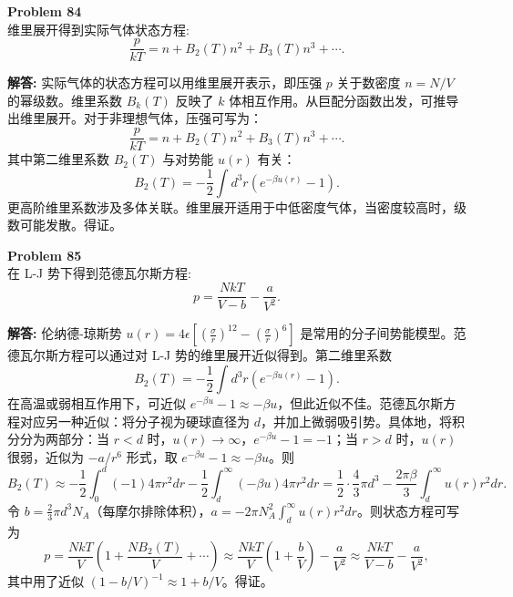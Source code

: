\documentclass[12pt, a4paper, oneside]{ctexart}
\newenvironment{solution}{\par\noindent\textbf{解答:}\quad}{\par}
\begin{document}
\begin{mdframed}[backgroundcolor=gray!10, linewidth=0pt]
    \textbf{Problem 84} \\
    维里展开得到实际气体状态方程:
    \[
    \frac{p}{kT} = n + B_2(T) n^2 + B_3(T) n^3 + \cdots.
    \]
\end{mdframed}
\begin{solution}
    实际气体的状态方程可以用维里展开表示，即压强 $p$ 关于数密度 $n = N/V$ 的幂级数。维里系数 $B_k(T)$ 反映了 $k$ 体相互作用。从巨配分函数出发，可推导出维里展开。对于非理想气体，压强可写为：
    \[
    \frac{p}{kT} = n + B_2(T) n^2 + B_3(T) n^3 + \cdots.
    \]
    其中第二维里系数 $B_2(T)$ 与对势能 $u(r)$ 有关：
    \[
    B_2(T) = -\frac{1}{2} \int d^3 r \left( e^{-\beta u(r)} - 1 \right).
    \]
    更高阶维里系数涉及多体关联。维里展开适用于中低密度气体，当密度较高时，级数可能发散。得证。
\end{solution}

\begin{mdframed}[backgroundcolor=gray!10, linewidth=0pt]
    \textbf{Problem 85} \\
    在 L-J 势下得到范德瓦尔斯方程:
    \[
    p = \frac{N k T}{V - b} - \frac{a}{V^2}.
    \]
\end{mdframed}
\begin{solution}
    伦纳德-琼斯势 $u(r) = 4\epsilon \left[ \left( \frac{\sigma}{r} \right)^{12} - \left( \frac{\sigma}{r} \right)^6 \right]$ 是常用的分子间势能模型。范德瓦尔斯方程可以通过对 L-J 势的维里展开近似得到。第二维里系数
    \[
    B_2(T) = -\frac{1}{2} \int d^3 r \left( e^{-\beta u(r)} - 1 \right).
    \]
    在高温或弱相互作用下，可近似 $e^{-\beta u} - 1 \approx -\beta u$，但此近似不佳。范德瓦尔斯方程对应另一种近似：将分子视为硬球直径为 $d$，并加上微弱吸引势。具体地，将积分分为两部分：当 $r < d$ 时，$u(r) \to \infty$，$e^{-\beta u} - 1 = -1$；当 $r > d$ 时，$u(r)$ 很弱，近似为 $-a/r^6$ 形式，取 $e^{-\beta u} - 1 \approx -\beta u$。则
    \[
    B_2(T) \approx -\frac{1}{2} \int_0^d (-1) 4\pi r^2 dr - \frac{1}{2} \int_d^\infty (-\beta u) 4\pi r^2 dr = \frac{1}{2} \cdot \frac{4}{3} \pi d^3 - \frac{2\pi \beta}{3} \int_d^\infty u(r) r^2 dr.
    \]
    令 $b = \frac{2}{3} \pi d^3 N_A$（每摩尔排除体积），$a = -2\pi N_A^2 \int_d^\infty u(r) r^2 dr$。则状态方程可写为
    \[
    p = \frac{N k T}{V} \left( 1 + \frac{N B_2(T)}{V} + \cdots \right) \approx \frac{N k T}{V} \left( 1 + \frac{b}{V} \right) - \frac{a}{V^2} \approx \frac{N k T}{V - b} - \frac{a}{V^2},
    \]
    其中用了近似 $(1 - b/V)^{-1} \approx 1 + b/V$。得证。
\end{solution}
\end{document}
